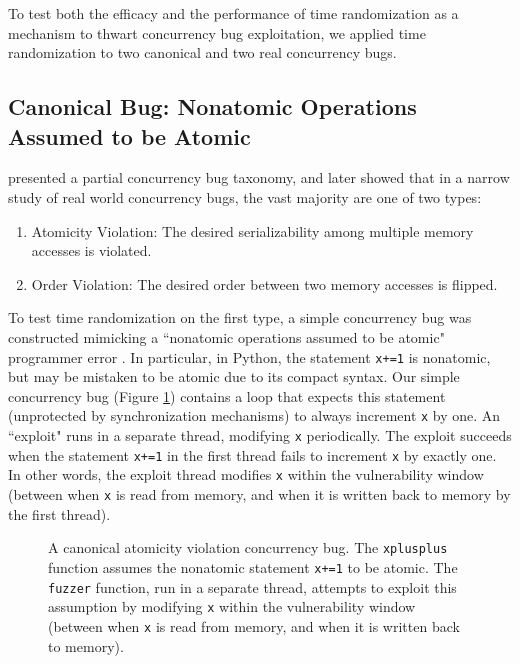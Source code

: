 To test both the efficacy and the performance of time randomization as a mechanism to thwart concurrency bug exploitation, we applied time randomization to two canonical and two real concurrency bugs.
\subsection{Canonical Bug: Nonatomic Operations Assumed to be Atomic}
\cite{Farchi2003} presented a partial concurrency bug taxonomy, and \cite{Lu2008} later showed that in a narrow study of real world concurrency bugs, the vast majority are one of two types:
\begin{enumerate}
	\item Atomicity Violation: The desired serializability among multiple memory accesses is violated.
	\item Order Violation: The desired order between two memory accesses is flipped.
\end{enumerate}
To test time randomization on the first type, a simple concurrency bug was constructed mimicking a ``nonatomic operations assumed to be atomic" programmer error \cite{Farchi2003}.
In particular, in Python, the statement \texttt{x+=1} is nonatomic, but may be mistaken to be atomic due to its compact syntax.
Our simple concurrency bug (Figure \ref{fig_nonatomic}) contains a loop that expects this statement (unprotected by synchronization mechanisms) to always increment \texttt{x} by one.
An ``exploit" runs in a separate thread, modifying \texttt{x} periodically.
The exploit succeeds when the statement \texttt{x+=1} in the first thread fails to increment \texttt{x} by exactly one.
In other words, the exploit thread modifies \texttt{x} within the vulnerability window (between when \texttt{x} is read from memory, and when it is written back to memory by the first thread).
\begin{figure}
	
	\caption{A canonical atomicity violation concurrency bug.  The \texttt{xplusplus} function assumes the nonatomic statement \texttt{x+=1} to be atomic.  The \texttt{fuzzer} function, run in a separate thread, attempts to exploit this assumption by modifying \texttt{x} within the vulnerability window (between when \texttt{x} is read from memory, and when it is written back to memory).}
	\label{fig_nonatomic}
\end{figure}

